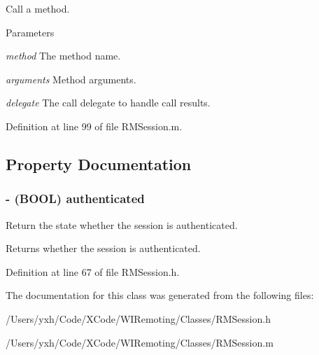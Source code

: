 Call a method. 
\begin{DoxyParams}{Parameters}
\item[{\em method}]The method name. \item[{\em arguments}]Method arguments. \item[{\em delegate}]The call delegate to handle call results. \end{DoxyParams}


Definition at line 99 of file RMSession.m.

\subsection{Property Documentation}
\hypertarget{interface_r_m_session_a71acbe4da4033e724b01e44d39ea2f24}{
\subsubsection[{authenticated}]{\setlength{\rightskip}{0pt plus 5cm}-\/ (BOOL) authenticated}}
\label{interface_r_m_session_a71acbe4da4033e724b01e44d39ea2f24}


Return the state whether the session is authenticated. \begin{DoxyReturn}{Returns}
whether the session is authenticated. 
\end{DoxyReturn}


Definition at line 67 of file RMSession.h.

The documentation for this class was generated from the following files:\begin{DoxyCompactItemize}
\item 
/Users/yxh/Code/XCode/WIRemoting/Classes/RMSession.h\item 
/Users/yxh/Code/XCode/WIRemoting/Classes/RMSession.m\end{DoxyCompactItemize}
